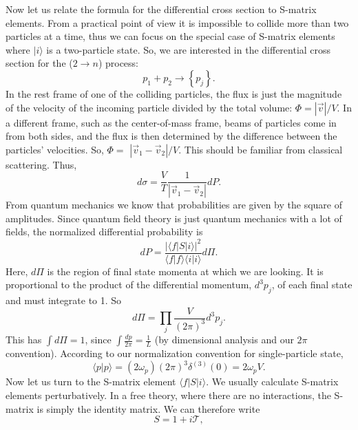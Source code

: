 Now let us relate the formula for the differential cross section to S-matrix elements. 
From a practical point of view it is impossible to collide more than two particles at a time, thus we can focus on the special case of S-matrix elements where $|i\rangle$ is a two-particle state. 
So, we are interested in the differential cross section for the ($2 \rightarrow n$) process:
\begin{equation}
	p_{1}+p_{2} \rightarrow\left\{p_{j}\right\}.
\end{equation}
In the rest frame of one of the colliding particles, the flux is just the magnitude of the velocity of the incoming particle divided by the total volume: $\Phi=|\vec{v}| / V$. 
In a different frame, such as the center-of-mass frame, beams of particles come in from both sides, and the flux is then determined by the difference between the particles' velocities. 
So, $\Phi=$ $\left|\vec{v}_{1}-\vec{v}_{2}\right| / V$. 
This should be familiar from classical scattering. 
Thus,
\begin{equation}
	d \sigma=\frac{V}{T} \frac{1}{\left|\vec{v}_{1}-\vec{v}_{2}\right|} d P.
\end{equation}
From quantum mechanics we know that probabilities are given by the square of amplitudes. 
Since quantum field theory is just quantum mechanics with a lot of fields, the normalized differential probability is
\begin{equation}
	dP=\frac{|\langle f|S| i\rangle|^{2}}{\langle f | f\rangle\langle i | i\rangle} d \Pi.
\end{equation}
Here, $d \Pi$ is the region of final state momenta at which we are looking. 
It is proportional to the product of the differential momentum, $d^{3} p_{j}$, of each final state and must integrate to 1. 
So
\begin{equation}
	d \Pi=\prod_{j} \frac{V}{(2 \pi)^{3}} d^{3} p_{j}.
\end{equation}
This has $\int d \Pi=1$, since $\int \frac{d p}{2 \pi}=\frac{1}{L}$ (by dimensional analysis and our $2 \pi$ convention).
According to our normalization convention for single-particle state,
\begin{equation}
	\langle p|p\rangle = (2\omega_p)(2\pi)^3\delta^{(3)}(0) = 2\omega_p V.
\end{equation}
Now let us turn to the S-matrix element $\langle f|S| i\rangle$. 
We usually calculate S-matrix elements perturbatively. 
In a free theory, where there are no interactions, the S-matrix is simply the identity matrix. 
We can therefore write
\begin{equation}
	S=1+i \mathcal{T},
\end{equation}
